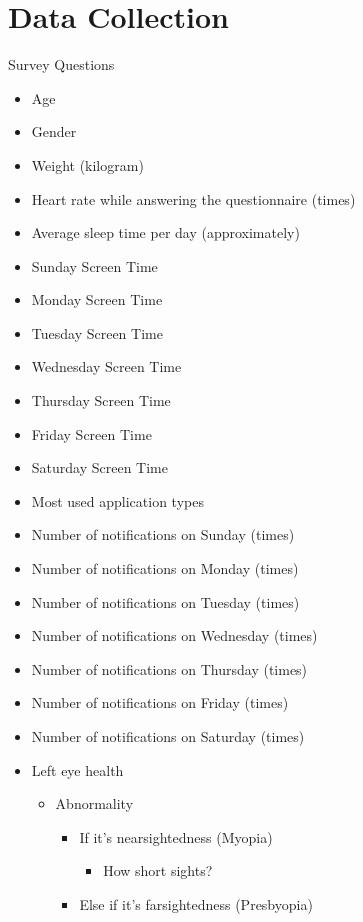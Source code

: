 \chapter*{Data Collection}
Survey Questions
\begin{multicols}{2}
    \begin{itemize}
        \item Age
        \item Gender
        \item Weight (kilogram)
        \item Heart rate while answering the questionnaire (times)
        \item Average sleep time per day (approximately)
        \item Sunday Screen Time
        \item Monday Screen Time
        \item Tuesday Screen Time
        \item Wednesday Screen Time
        \item Thursday Screen Time
        \item Friday Screen Time
        \item Saturday Screen Time
        \item Most used application types
        \item Number of notifications on Sunday (times)
        \item Number of notifications on Monday (times)
        \item Number of notifications on Tuesday (times)
        \item Number of notifications on Wednesday (times)
        \item Number of notifications on Thursday (times)
        \item Number of notifications on Friday (times)
        \item Number of notifications on Saturday (times)
        \item Left eye health
        \begin{itemize}
            \item Abnormality
            \begin{itemize}
                \item If it's nearsightedness (Myopia)
                \begin{itemize}
                    \item How short sights?
                \end{itemize}
                \item Else if it's farsightedness (Presbyopia)

\end{itemize}
\end{itemize}
\end{itemize}
\end{multicols}
